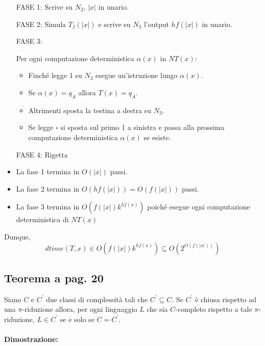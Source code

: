 \begin{itemize}
    \item [FASE 1:] Scrive su $N_{2}$, $|x|$ in unario.
    \item [FASE 2:] {
        Simula $T_{f}(|x|)$ e scrive su $N_{3}$ l'output $hf(|x|)$ in unario.
    }
    \item [FASE 3:] {
        Per ogni computazione deterministica $\alpha(x)$ in $NT(x)$:
        \begin{itemize}
            \item Finché legge 1 su $N_{3}$ esegue un'istruzione lungo $\alpha(x)$.
            \item Se $\alpha(x) = q_{A}$ allora $T(x) = q_{A}$.
            \item Altrimenti sposta la testina a destra su $N_{3}$.
            \item Se legge $\square$ si sposta sul primo 1 a sinistra e passa alla prossima computazione deterministica $\alpha(x)$ se esiste.
        \end{itemize}
    }
    \item [FASE 4:] Rigetta
\end{itemize}

\begin{itemize}
    \item La fase 1 termina in $O(|x|)$ passi.
    \item La fase 2 termina in $O(hf(|x|)) = O(f(|x|))$ passi.
    \item La fase 3 termina in $O(f(|x|)k^{hf(x)})$ poiché esegue ogni computazione deterministica di $NT(x)$
\end{itemize}

Dunque, $$dtime(T, x) \in O(f(|x|)k^{hf(x)}) \subseteq{O(2^{O(f(|x|))})}$$

\subsection{Teorema a pag. 20}

Siano $C$ e $C^{'}$ due classi di complessità tali che $C^{'} \subseteq C$. Se $C^{'}$ è chiusa rispetto ad una $\pi$-riduzione
allora, per ogni linguaggio $L$ che sia $C$-completo rispetto a tale $\pi$-riduzione, $L \in C^{'}$ se e solo se $C = C^{'}$.

\paragraph*{Dimostrazione:}

